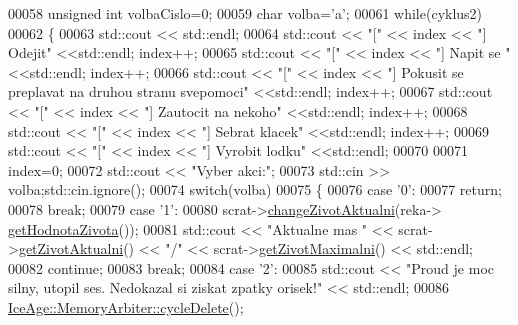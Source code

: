 \begin{DoxyCode}
00058     \textcolor{keywordtype}{unsigned} \textcolor{keywordtype}{int} volbaCislo=0; 
00059     \textcolor{keywordtype}{char} volba=\textcolor{charliteral}{'a'};
00061     \textcolor{keywordflow}{while}(cyklus2) 
00062     \{
00063             std::cout << std::endl;
00064             std::cout << \textcolor{stringliteral}{"["} << index << \textcolor{stringliteral}{"] Odejit"} <<std::endl; index++;
00065             std::cout << \textcolor{stringliteral}{"["} << index << \textcolor{stringliteral}{"] Napit se "} <<std::endl; index++;
00066             std::cout << \textcolor{stringliteral}{"["} << index << \textcolor{stringliteral}{"] Pokusit se preplavat na druhou stranu svepomoci"} <<std::endl;
      index++;
00067             std::cout << \textcolor{stringliteral}{"["} << index << \textcolor{stringliteral}{"] Zautocit na nekoho"} <<std::endl; index++;
00068             std::cout << \textcolor{stringliteral}{"["} << index << \textcolor{stringliteral}{"] Sebrat klacek"} <<std::endl; index++;
00069             std::cout << \textcolor{stringliteral}{"["} << index << \textcolor{stringliteral}{"] Vyrobit lodku"} <<std::endl;
00070 
00071             index=0;
00072             std::cout << \textcolor{stringliteral}{"Vyber akci:"};
00073             std::cin >> volba;std::cin.ignore();
00074             \textcolor{keywordflow}{switch}(volba)
00075             \{
00076                 \textcolor{keywordflow}{case} \textcolor{charliteral}{'0'}:
00077                     \textcolor{keywordflow}{return};
00078                     \textcolor{keywordflow}{break};
00079                 \textcolor{keywordflow}{case} \textcolor{charliteral}{'1'}:
00080                     scrat->\hyperlink{classIceAge_1_1Zivot_a980dc5a5af6d14c23ecca025e3ec7485}{changeZivotAktualni}(reka->
      \hyperlink{classIceAge_1_1Reka_acc4d9a4ef69da03eed8762e16a33b49f}{getHodnotaZivota}());
00081                     std::cout << \textcolor{stringliteral}{"Aktualne mas "} << scrat->\hyperlink{classIceAge_1_1Zivot_ae4e3a167722a80ccace3985f183ddd8d}{getZivotAktualni}() << \textcolor{stringliteral}{"/"} << 
      scrat->\hyperlink{classIceAge_1_1Zivot_a75a65879dd6ddc0bc3e402ac6f613813}{getZivotMaximalni}() << std::endl;
00082                     \textcolor{keywordflow}{continue};
00083                     \textcolor{keywordflow}{break};
00084                 \textcolor{keywordflow}{case} \textcolor{charliteral}{'2'}:
00085                     std::cout << \textcolor{stringliteral}{"Proud je moc silny, utopil ses. Nedokazal si ziskat zpatky orisek!"} << 
      std::endl;
00086                     \hyperlink{classIceAge_1_1MemoryArbiter_ae3460492678cf992629f4a70de3ef1ca}{IceAge::MemoryArbiter::cycleDelete}();

\end{DoxyCode}
